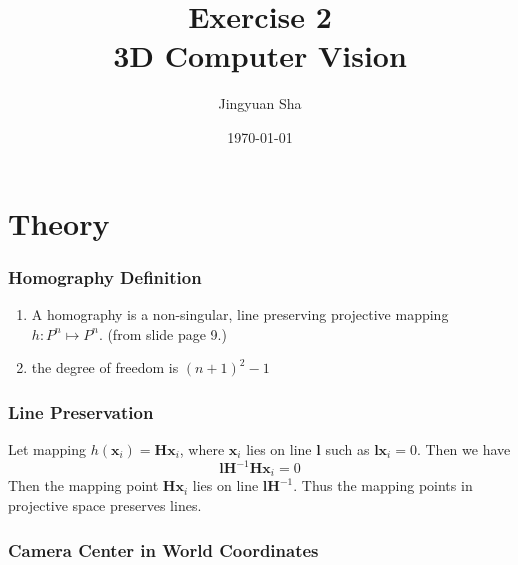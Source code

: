 \documentclass[a4paper, twoside, english]{article}
\title{Exercise 2 \\ 3D Computer Vision}  %
\author{Jingyuan Sha}                       %
\date{\today}                              %
\begin{document}
\maketitle

\part{Theory}

\section{Homography Definition}

\begin{enumerate}
	\item  A homography is a non-singular, line preserving projective mapping $ h: P^n \mapsto P^n $. (from slide page 9.)
	\item the degree of freedom is $ (n+1)^2-1 $
\end{enumerate}

\section{Line Preservation}
	Let mapping $ h(\textbf{x}_i) = \textbf{H}\textbf{x}_i $, where $ \textbf{x}_i $ lies on line \textbf{l} such as $ \textbf{l}\textbf{x}_i=0 $. Then we have 
	\[ \textbf{l} \textbf{H}^{-1}\textbf{H}\textbf{x}_i=0 \]
	Then the mapping point $ \textbf{H}\textbf{x}_i $ lies on line $ \textbf{l}\textbf{H}^{-1} $. Thus the mapping points in projective space preserves lines.

\section{Camera Center in World Coordinates}
\end{document}
